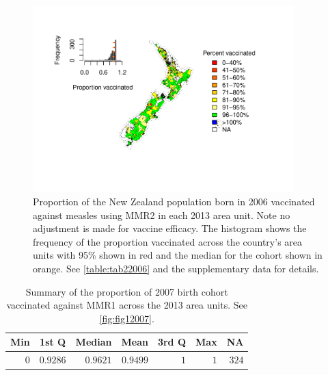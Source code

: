 \documentclass{article}
\begin{document}
\begin{figure}
\begin{center}
\includegraphics[width=0.9\textwidth]{nir_census_MMR2_NIR_2006.pdf}
\end{center}
    \caption{Proportion of the New Zealand population born in 2006 vaccinated against measles using MMR2 in each 2013 area unit. Note no adjustment is made for vaccine efficacy. The histogram shows the frequency of the proportion vaccinated across the country's area units with 95\% shown in red and the median for the cohort shown in orange. See \autoref{table:tab22006} and the supplementary data for details.}
\label{fig:fig22006}
\end{figure}

 \vspace{5mm} %
\begin{table}
\begin{center}
\begin{tabular}{rrrrrrr}
\hline\hline
\multicolumn{1}{c}{Min}&\multicolumn{1}{c}{1st Q}&\multicolumn{1}{c}{Median}&\multicolumn{1}{c}{Mean}&\multicolumn{1}{c}{3rd Q}&\multicolumn{1}{c}{Max}&\multicolumn{1}{c}{NA}\tabularnewline
\hline
$0$&$0.9286$&$0.9621$&$0.9499$&$1$&$1$&$324$\tabularnewline
\hline
\end{tabular}\end{center}\caption{Summary of the proportion of 2007 birth cohort vaccinated against MMR1 across the 2013 area units. See \autoref{fig:fig12007}.}
\label{table:tab12007}
\end{table}
\end{document}
